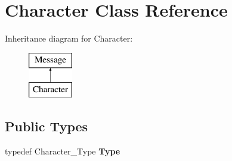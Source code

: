 \hypertarget{classCharacter}{}\section{Character Class Reference}
\label{classCharacter}
Inheritance diagram for Character\+:\begin{figure}[H]
\begin{center}
\leavevmode
\includegraphics[height=2.000000cm]{classCharacter}
\end{center}
\end{figure}
\subsection*{Public Types}
\begin{DoxyCompactItemize}
\item 
typedef Character\+\_\+\+Type {\bfseries Type}\hypertarget{classCharacter_a1087098b8b7dfecf877b4fae559e4fd4}{}\label{classCharacter_a1087098b8b7dfecf877b4fae559e4fd4}

\end{DoxyCompactItemize}
